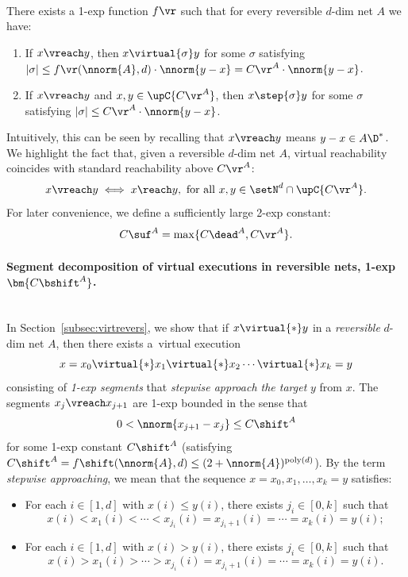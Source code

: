 \begin{lem}\label{lem:fvr}
\hfill\\	
	There exists a 1-exp function $f\vr$ such that 
for every reversible $d$-dim net $A$ we have:
	\begin{enumerate}
		\item
If $x\vreach y$, then  $x\virtual{\sigma}y$
for some $\sigma$ satisfying
			$|\sigma|\leq
			f\vr(\nnorm{A},d)\cdot\nnorm{y-x}=
		C\vr^A\cdot \nnorm{y-x}$.
\item
If $x\vreach y$
			and  $x,y\in\upC{C\vr^A}$, 
	then $x\step{\sigma}y$
	for some $\sigma$ satisfying
$|\sigma|\leq
		C\vr^A\cdot \nnorm{y-x}$.
	\end{enumerate}
	\end{lem}
\noindent
Intuitively, this can be seen by recalling that $x\vreach y$ means
$y-x\in A\D^*$. 
We highlight the fact that, given a reversible $d$-dim net $A$,  virtual reachability coincides with
standard reachability above $C\vr^A$:
\begin{equation*}
	x\vreach y\iff x\reach y,\text{ for all
	}x,y\in\setN^d\cap \upC{C\vr^A}.
\end{equation*}
For later convenience, we define a sufficiently large 2-exp
constant:
\begin{equation}\label{eq:Csuf}
C\suf^A=\max\{C\dead^A,C\vr^A\}.
\end{equation}


\paragraph{Segment decomposition of virtual executions in reversible nets,
1-exp $\bm{C\bshift^A}$.}
\ \\
In Section~\ref{subsec:virtrevers}, 
we show that
if $x\virtual{*}y$ in a \emph{reversible} $d$-dim net $A$, then
there exists
a~virtual execution 
\begin{equation}\label{eq:virtsegment}
x=x_0\virtual{*}x_1\virtual{*}x_2\cdots\virtual{*}x_k=y
\end{equation}
consisting of \emph{1-exp segments} 
that \emph{stepwise approach the
target} $y$ from $x$.
The segments $x_j\vreach x_{j+1}$ are 1-exp bounded in the sense that
\begin{equation}\label{eq:Cshift}
0<\nnorm{x_{j+1}-x_j}\leq C\shift^A
\end{equation}
for some 1-exp constant $C\shift^A$ (satisfying
$C\shift^A=f\shift(\nnorm{A},d)\leq
(2+\nnorm{A})^{\text{poly}(d)}$).
By the term \emph{stepwise approaching},
	we mean that the sequence $x = x_0, x_1, \dots, x_k = y$ satisfies:
\begin{itemize}
    \item For each $i \in [1, d]$ with $x(i) \leq y(i)$, there exists
	    $j_i\in [0,k]$ such that
		\[ x(i) < x_1(i) < \cdots < x_{j_i}(i) = x_{{j_i}+1}(i) = \cdots = x_k(i)
		= y(i); \]
    \item For each $i \in [1, d]$ with $x(i) > y(i)$,  there exists
	    $j_i\in [0,k]$ such that
		\[ x(i) > x_1(i) > \cdots > x_{j_i}(i) = x_{{j_i}+1}(i) = \cdots = x_k(i)
		= y(i). \]
\end{itemize}

